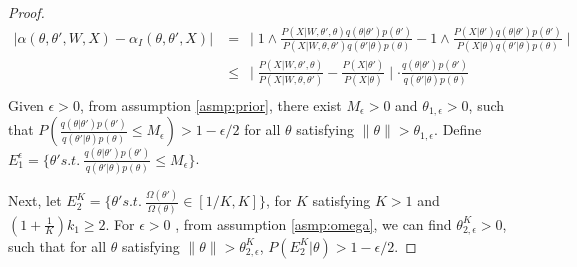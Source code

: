 \begin{proof}
\begin{align*}
|\alpha(\theta, \theta', W, X) - \alpha_I(\theta, \theta', X)| &= \ \mid 1 \wedge \frac{P(X | W, \theta' , \theta)q(\theta | \theta')p(\theta')}{P(X | W, \theta , \theta')q(\theta' | \theta)p(\theta)} - 1 \wedge \frac{P(X | \theta')q(\theta | \theta')p(\theta')}{P(X | \theta)q(\theta' | \theta)p(\theta)} \mid \\
& \leq \ \mid \frac{P(X | W, \theta' , \theta)}{P(X | W, \theta , \theta')} - \frac{P(X | \theta')}{P(X | \theta)}\mid  \cdot  \frac{q(\theta | \theta')p(\theta')}{q(\theta' | \theta)p(\theta)}\\
\end{align*}
Given $\epsilon > 0$, from assumption \ref{asmp:prior}, there exist $M_\epsilon > 0$ and $\theta_{1,\epsilon} > 0$, such that $P(\frac{q(\theta | \theta')p(\theta')}{q(\theta' | \theta)p(\theta)}\leq M_\epsilon) > 1 - \epsilon / 2$ {for all } $\theta$ satisfying $ \| \theta \| > \theta_{1,\epsilon}$.
Define $E_1^\epsilon = \{\theta' s.t.\ \frac{q(\theta | \theta')p(\theta')}{q(\theta' | \theta)p(\theta)}\leq M_\epsilon\}$.%

Next, let $E^K_2 = \{\theta' s.t.\ \frac{\Omega(\theta')}{\Omega(\theta)}\in [1/K, K] \}$, for $K$ satisfying $K > 1$ and $(1 + \frac{1}{K})k_1 \ge 2$. For $\epsilon > 0$ , from assumption \ref{asmp:omega}, we can find $\theta_{2, \epsilon}^K > 0$, such that for all $\theta$ satisfying $\| \theta \| > \theta_{2, \epsilon}^K$,
$P(E^K_2 | \theta) > 1 - \epsilon / 2$.


\end{proof}

